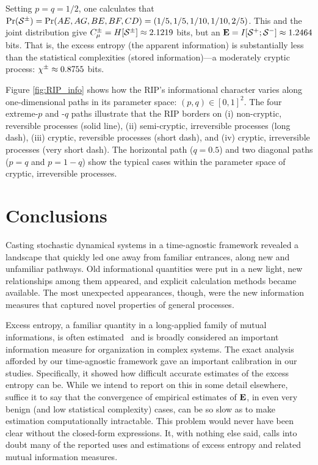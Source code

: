 Setting $p = q = 1/2$, one calculates that
$\Pr({\mathcal{S}}^{\pm}) = \Pr(AE,AG,BE,BF,CD) = \left(1/5,1/5,1/10,1/10,2/5\right)$.
This and the joint distribution give
$C_\mu^{\pm} = H[{\mathcal{S}}^{\pm}] \approx 2.1219$ bits,
but an ${\bf E} = I[{\mathcal{S}}^{+};{\mathcal{S}}^{-}] \approx 1.2464$ bits.
That is, the excess entropy (the apparent information) is substantially less
than the statistical complexities (stored information)---a moderately cryptic
process: $\chi^\pm \approx 0.8755$ bits.

Figure \ref{fig:RIP_info} shows how the RIP's informational character varies
along one-dimensional paths in its parameter space: $(p,q) \in [0,1]^2$.
The four extreme-$p$ and -$q$ paths illustrate that the RIP borders on
(i) non-cryptic, reversible processes (solid line), (ii) semi-cryptic,
irreversible processes (long dash), (iii) cryptic, reversible processes
(short dash), and (iv) cryptic, irreversible processes (very short dash).
The horizontal path ($q = 0.5$) and two diagonal paths ($p = q$
and $p = 1 - q$) show the typical cases within the parameter space
of cryptic, irreversible processes.

\section{Conclusions}

Casting stochastic dynamical systems in a time-agnostic framework revealed a
landscape that quickly led one away from familiar entrances, along new and
unfamiliar pathways. Old informational quantities were put in a new light,
new relationships among them appeared, and explicit calculation methods
became available. The most unexpected appearances, though, were the new
information measures that captured novel properties of general processes.

Excess entropy, a familiar quantity in a long-applied family of mutual
informations, is often estimated~%
\cite{Fras90b,Casd91a,Spro03a,Kant06a,Arno96,Crut97a,Feld98b,Tono94a,Bial00a,Ebel94c,Debo08a}
and is broadly considered an important information measure for organization in
complex systems. The exact analysis afforded by our time-agnostic framework
gave an important calibration in our studies. Specifically, it showed how
difficult accurate estimates of the excess entropy can be. While we intend to
report on this in some detail elsewhere, suffice it to say that the convergence
of empirical estimates of ${\bf E}$, in even very benign (and low statistical
complexity)
cases, can be so slow as to make estimation computationally intractable.
This problem would never have been clear without the closed-form expressions.
It, with nothing else said, calls into doubt many of the reported uses
and estimations of excess entropy and related mutual information measures.

